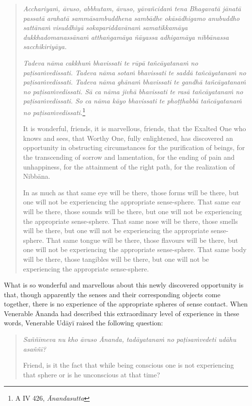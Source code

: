 \begin{quote}
\emph{Acchariyaṁ, āvuso, abbhutam, āvuso, yāvañcidaṁ tena Bhagavatā jānatā passatā arahatā sammāsambuddhena sambādhe okāsādhigamo anubuddho sattānaṁ visuddhiyā sokapariddavānaṁ samatikkamāya dukkhadomanassānaṁ atthaṅgamāya ñāyassa adhigamāya nibbānassa sacchikiriyāya.}

\emph{Tadeva nāma cakkhuṁ bhavissati te rūpā tañcāyatanaṁ no paṭisaṁvedissati. Tadeva nāma sotaṁ bhavissati te saddā tañcāyatanaṁ no paṭisaṁvedissati. Tadeva nāma ghānaṁ bhavissati te gandhā tañcāyatanaṁ no paṭisaṁvedissati. Sā ca nāma jivhā bhavissati te rasā tañcāyatanaṁ no paṭisaṁvedissati. So ca nāma kāyo bhavissati te phoṭṭhabbā tañcāyatanaṁ no paṭisaṁvedissati.}\footnote{A IV 426, \emph{Ānandasutta}}

It is wonderful, friends, it is marvellous, friends, that the Exalted One who knows and sees, that Worthy One, fully enlightened, has discovered an opportunity in obstructing circumstances for the purification of beings, for the transcending of sorrow and lamentation, for the ending of pain and unhappiness, for the attainment of the right path, for the realization of Nibbāna.

In as much as that same eye will be there, those forms will be there, but one will not be experiencing the appropriate sense-sphere. That same ear will be there, those sounds will be there, but one will not be experiencing the appropriate sense-sphere. That same nose will be there, those smells will be there, but one will not be experiencing the appropriate sense-sphere. That same tongue will be there, those flavours will be there, but one will not be experiencing the appropriate sense-sphere. That same body will be there, those tangibles will be there, but one will not be experiencing the appropriate sense-sphere.
\end{quote}

What is so wonderful and marvellous about this newly discovered opportunity is that, though apparently the senses and their corresponding objects come together, there is no experience of the appropriate spheres of sense contact. When Venerable Ānanda had described this extraordinary level of experience in these words, Venerable Udāyī raised the following question:

\begin{quote}
\emph{Saññīmeva nu kho āvuso Ānanda, tadāyatanaṁ no paṭisaṁvedeti udāhu asaññī?}

Friend, is it the fact that while being conscious one is not experiencing that sphere or is he unconscious at that time?
\end{quote}

